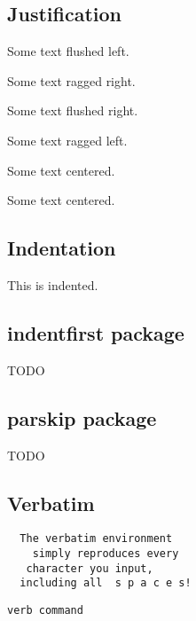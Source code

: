 \documentclass{article}
\begin{document}
  \subsection{Justification}

  \begin{flushleft}Some text flushed left.\end{flushleft}

  {\raggedright{}Some text ragged right.}

  \begin{flushright}Some text flushed right.\end{flushright}

  {\raggedleft{}Some text ragged left.}

  \begin{center}
    Some text centered.
  \end{center}

  {\centering{}Some text centered.}

  \subsection{Indentation}

  \indent This is indented.

  \subsection{indentfirst package}
  TODO

  \subsection{parskip package}
  TODO

  \subsection{Verbatim}

  \begin{verbatim}
  The verbatim environment
    simply reproduces every
   character you input,
  including all  s p a c e s!
  \end{verbatim}

  \verb+verb command+
\end{document}
